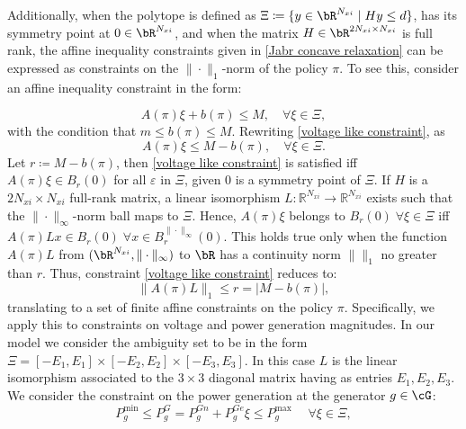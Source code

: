 \documentclass[11pt,a4paper,oneside,openany]{book}
\numberwithin{definition}{section}
\numberwithin{theorem}{section}
\numberwithin{problem}{section}
\begin{document}
Additionally, when the polytope is defined as $\Xi \coloneqq \{ y \in \bR^{N_{xi}} \mid Hy \leq d\}$, has its symmetry point at $0 \in \bR^{N_{xi}}$, and when the matrix \(H \in \bR^{2N_{xi} \times N_{xi}}\) is full rank, the affine inequality constraints given in \eqref{Jabr concave relaxation} can be expressed as constraints on the \(\|\cdot\|_{1}\)-norm of the policy \(\pi\). To see this, consider an affine inequality constraint in the form:

\begin{equation} \label{voltage like constraint}
A(\pi)\xi + b(\pi) \leq M, \quad \forall \xi \in \Xi,
\end{equation}
with the condition that $m \leq b(\pi) \leq M$.  Rewriting \eqref{voltage like constraint}, as
\[ A(\pi)\xi \leq M - b(\pi), \quad \forall \xi \in \Xi.\] 
Let \( r \coloneqq  M - b(\pi) \),
then \eqref{voltage like constraint} is satisfied iff  \( A(\pi)\xi\in B_r(0)\) for all $\varepsilon$ in $\Xi$, given $0$ is a symmetry point of $\Xi$. If \(H\) is a \( 2N_{xi} \times N_{xi}\) full-rank matrix, a linear isomorphism \( L: \mathbb{R}^{N_{xi}} \to \mathbb{R}^{N_{xi}}\) exists such that the \(\|\cdot\|_{\infty}\)-norm ball maps to \(\Xi\). Hence, $A(\pi)\xi$ belongs to $B_r(0) \; \forall \xi \in \Xi$ iff $A(\pi)Lx \in B_r(0) \; \forall x \in  B^{\|\cdot\|_{\infty}}_r(0)$. This holds true only when the function $A(\pi)L$ from $(\bR^{N_{xi}},\|\cdot\|_{\infty})$ to $\bR$ has a continuity norm $\|\|_{1}$ no greater than $r$. Thus, constraint \eqref{voltage like constraint} reduces to:
\begin{equation}
    \|A(\pi)L\|_{1} \leq r = |M - b(\pi)|,
\end{equation}
translating to a set of finite affine constraints on the policy $\pi$. Specifically, we apply this to constraints on voltage and power generation magnitudes. In our model we consider the ambiguity set to be in the form $\Xi = [-E_1,E_1] \times [-E_2,E_2] \times [-E_3,E_3]$. In this case $L$ is the linear isomorphism associated to the $3\times3$ diagonal matrix having as entries $E_1,E_2,E_3$. We consider the constraint on the power generation at the generator $g \in \cG$: \[
P_g^{\text{min}}\leq P_{g}^G = P_{g}^{Gn} + P_{g}^{Ge}\xi \leq P_g^{\text{max}} \; \quad \forall \xi \in \Xi,
\]
\end{document}
